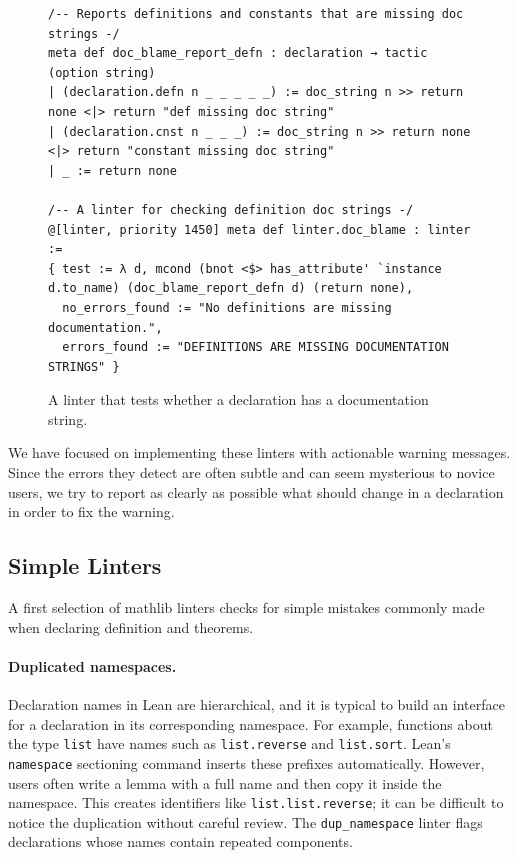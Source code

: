 \documentclass[runningheads]{llncs}
\newcommand{\mathlib}{\textsf{mathlib}\xspace}
\newcommand{\lean}[1]{\lstinline[language=lean]{#1}}
\begin{document}
\begin{figure}[t]
\begin{lstlisting}
/-- Reports definitions and constants that are missing doc strings -/
meta def doc_blame_report_defn : declaration → tactic (option string)
| (declaration.defn n _ _ _ _ _) := doc_string n >> return none <|> return "def missing doc string"
| (declaration.cnst n _ _ _) := doc_string n >> return none <|> return "constant missing doc string"
| _ := return none

/-- A linter for checking definition doc strings -/
@[linter, priority 1450] meta def linter.doc_blame : linter :=
{ test := λ d, mcond (bnot <$> has_attribute' `instance d.to_name) (doc_blame_report_defn d) (return none),
  no_errors_found := "No definitions are missing documentation.",
  errors_found := "DEFINITIONS ARE MISSING DOCUMENTATION STRINGS" }
\end{lstlisting}
\caption{A linter that tests whether a declaration has a documentation string.}
\label{fig:doc-blame}
\end{figure}

We have focused on implementing these linters
with actionable warning messages.
Since the errors they detect are often subtle
and can seem mysterious to novice users,
we try to report as clearly as possible
what should change in a declaration
in order to fix the warning.

\subsection{Simple Linters}
\label{subsection:simple-linters}

A first selection of \mathlib linters
checks for simple mistakes
commonly made when declaring definition and theorems.

\paragraph{Duplicated namespaces.}
Declaration names in Lean are hierarchical,
and it is typical to build an interface for a declaration
in its corresponding namespace.
For example, functions about the type \lean{list}
have names such as \lean{list.reverse} and \lean{list.sort}.
Lean's \lean{namespace} sectioning command
inserts these prefixes automatically.
However, users often write a lemma with a full name
and then copy it inside the namespace.
This creates identifiers like \lean{list.list.reverse};
it can be difficult to notice the duplication without careful review.
The \lean{dup_namespace} linter flags declarations
whose names contain repeated components.
\end{document}

